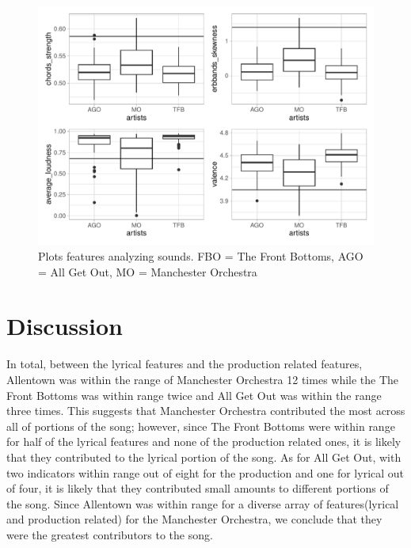 \documentclass{article}\usepackage[]{graphicx}\usepackage[]{xcolor}
\begin{document}
\begin{multicols}{2}
     \begin{figure}[H]
    \begin{center}
       \includegraphics[scale=0.4]{sound2.pdf}
       \caption{Plots features analyzing sounds. FBO = The Front Bottoms, AGO = 
       All Get Out, MO = Manchester Orchestra}
     \label{sound2}
     \end{center}
   \end{figure}



\section{Discussion}
  In total, between the lyrical features and the production related features, Allentown was within the range of Manchester Orchestra 12 times while the The Front Bottoms was within range twice and All Get Out was within the range three times. This suggests that Manchester Orchestra contributed the most across all of portions of the song; however, since The Front Bottoms were within range for half of the lyrical features and none of the production related ones, it is likely that they contributed to the lyrical portion of the song. As for All Get Out, with two indicators within range out of eight for the production and one for lyrical out of four, it is likely that they contributed small amounts to different portions of the song.
  Since Allentown was within range for a diverse array of features(lyrical and production related) for the Manchester Orchestra, we conclude that they were the greatest contributors to the song. 

\vspace{2em}

\begin{tiny}

\end{tiny}
\end{multicols}
\end{document}
